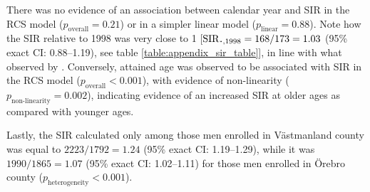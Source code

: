 There was no evidence of an association between calendar year and SIR in the RCS model ($p_{\textrm{overall}}=0.21$) or in a simpler linear model ($p_{\textrm{linear}}=0.88$). Note how the SIR relative to 1998 was very close to 1 [$\SIR_{\LargerCdot,1998} = 168/173 = 1.03$ (95\% exact CI: 0.88--1.19), see table \ref{table:appendix_sir_table}], in line with what observed by \citet{orsini_physical_2008}. Conversely, attained age was observed to be associated with SIR in the RCS model ($p_{\textrm{overall}}<0.001$), with evidence of non-linearity ($p_{\textrm{non-linearity}}=0.002$), indicating evidence of an increased SIR at older ages as compared with younger ages.

Lastly, the SIR calculated only among those men enrolled in Västmanland county was equal to $2223/1792 =1.24$ (95\% exact CI: 1.19--1.29), while it was $1990/1865=1.07$ (95\% exact CI: 1.02--1.11) for those men enrolled in Örebro county ($p_{\mathrm{heterogeneity}} < 0.001$). 

